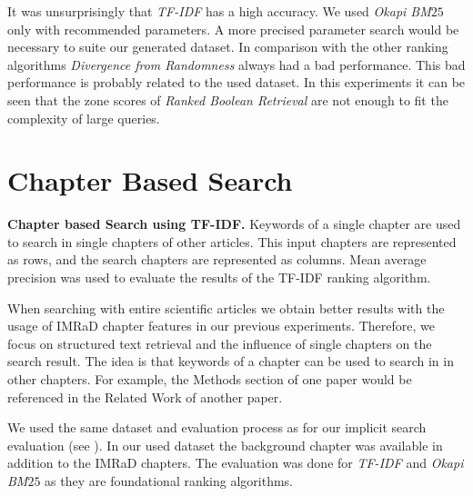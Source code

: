 It was unsurprisingly that \textit{TF-IDF} has a high accuracy. We used \textit{Okapi BM$25$} only with recommended parameters. A more precised parameter search would be necessary to suite our generated dataset. In comparison with the other ranking algorithms \textit{Divergence from Randomness} always had a bad performance. This bad performance is probably related to the used dataset. In this experiments it can be seen that the zone scores of \textit{Ranked Boolean Retrieval} are not enough to fit the complexity of large queries. 


\section{Chapter Based Search}

\begin{table}[b!]
\vrule{}\vrule
  \caption[Chapter based Search using TF-IDF]{\textbf{Chapter based Search using TF-IDF.} Keywords of a single chapter are used to search in single chapters of other articles. This input chapters are represented as rows, and the search chapters are represented as columns. Mean average precision was used to evaluate the results of the TF-IDF ranking algorithm.}
  \label{tbl:chapter_based_tfidf}
\end{table}

When searching with entire scientific articles we obtain better results with the usage of IMRaD chapter features in our previous experiments. Therefore, we focus on structured text retrieval and the influence of single chapters on the search result. The idea is that keywords of a chapter can be used to search in in other chapters. For example, the Methods section of one paper would be referenced in the Related Work of another paper.

We used the same dataset and evaluation process as for our implicit search evaluation (see ). In our used dataset the background chapter was available in addition to the IMRaD chapters. The evaluation was done for \textit{TF-IDF} and \textit{Okapi BM$25$} as they are foundational ranking algorithms.

